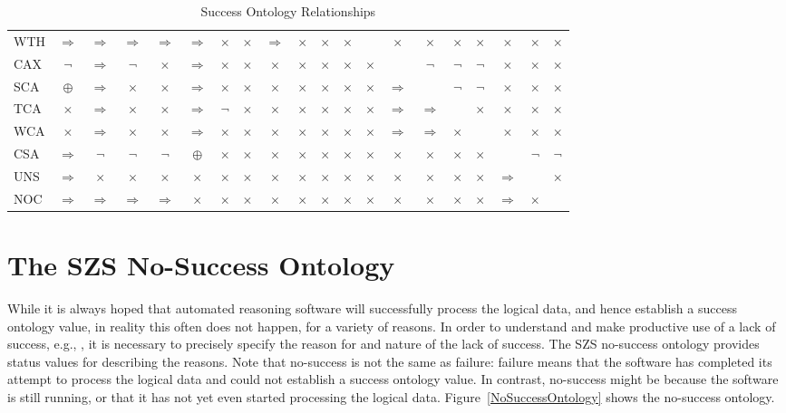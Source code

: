 \documentclass[a4paper]{easychair}
\newcommand{\isa}{$\Rightarrow$}
\newcommand{\nta}{$\neg$}
\newcommand{\nra}{$\times$}
\newcommand{\xor}{$\oplus$}
\newcommand{\equ}{\textbullet}
\begin{document}
\begin{table}[bt]
\begin{center}
\begin{tabular}{l|ccccccccccccccccccc}
{\footnotesize WTH} &\isa &\isa &\isa &\isa &\isa &\nra &\nra &\isa &\nra &\nra &\nra &\equ &\nra &\nra &\nra &\nra &\nra &\nra &\nra \\
{\footnotesize CAX} &\nta &\isa &\nta &\nra &\isa &\nra &\nra &\nra &\nra &\nra &\nra &\nra &\equ &\nta &\nta &\nta &\nra &\nra &\nra \\
{\footnotesize SCA} &\xor &\isa &\nra &\nra &\isa &\nra &\nra &\nra &\nra &\nra &\nra &\nra &\isa &\equ &\nta &\nta &\nra &\nra &\nra \\
{\footnotesize TCA} &\nra &\isa &\nra &\nra &\isa &\nta &\nra &\nra &\nra &\nra &\nra &\nra &\isa &\isa &\equ &\nra &\nra &\nra &\nra \\
{\footnotesize WCA} &\nra &\isa &\nra &\nra &\isa &\nra &\nra &\nra &\nra &\nra &\nra &\nra &\isa &\isa &\nra &\equ &\nra &\nra &\nra \\
{\footnotesize CSA} &\isa &\nta &\nta &\nta &\xor &\nra &\nra &\nra &\nra &\nra &\nra &\nra &\nra &\nra &\nra &\nra &\equ &\nta &\nta \\
{\footnotesize UNS} &\isa &\nra &\nra &\nra &\nra &\nra &\nra &\nra &\nra &\nra &\nra &\nra &\nra &\nra &\nra &\nra &\isa &\equ &\nra \\
{\footnotesize NOC} &\isa &\isa &\isa &\isa &\nra &\nra &\nra &\nra &\nra &\nra &\nra &\nra &\nra &\nra &\nra &\nra &\isa &\nra &\equ \\
\hline
\end{tabular}
\end{center}
\caption{Success Ontology Relationships}
\label{Relationships}
\end{table}
\section{The SZS No-Success Ontology}
\label{NoSuccess}

While it is always hoped that automated reasoning software will successfully
process the logical data, and hence establish a success ontology value,
in reality this often does not happen, for a variety of reasons.
In order to understand and make productive use of a lack of success, e.g.,
\cite{MBI94,IB96}, it is necessary to precisely specify the reason for and
nature of the lack of success.
The SZS no-success ontology provides status values for describing the reasons.
Note that no-success is not the same as failure: failure means that the
software has completed its attempt to process the logical data and could not
establish a success ontology value.
In contrast, no-success might be because the software is still running, or
that it has not yet even started processing the logical data.
Figure~\ref{NoSuccessOntology} shows the no-success ontology.
\end{document}
